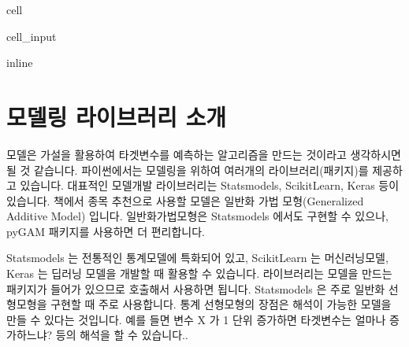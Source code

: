 \documentclass[letterpaper,10pt,english]{jupyterBook}
\begin{document}
\begin{sphinxuseclass}{cell}\begin{sphinxVerbatimInput}

\begin{sphinxuseclass}{cell_input}
\begin{sphinxVerbatim}[commandchars=\\\{\}]
   
 inline
   
   
   
 
  
\end{sphinxVerbatim}

\end{sphinxuseclass}\end{sphinxVerbatimInput}

\end{sphinxuseclass}

\part{모델링 라이브러리 소개}
\label{\detokenize{chapter5/5.2.2_Modeling_Library:id1}}\label{\detokenize{chapter5/5.2.2_Modeling_Library::doc}}
\sphinxAtStartPar
모델은 가설을 활용하여 타겟변수를 예측하는 알고리즘을 만드는 것이라고 생각하시면 될 것 같습니다. 파이썬에서는 모델링을 위하여 여러개의 라이브러리(패키지)를 제공하고 있습니다. 대표적인 모델개발 라이브러리는 Statsmodels, Scikit\sphinxhyphen{}Learn, Keras 등이 있습니다. 책에서 종목 추천으로 사용할 모델은 일반화 가법 모형(Generalized Additive Model) 입니다. 일반화가법모형은 Statsmodels 에서도 구현할 수 있으나, pyGAM 패키지를 사용하면 더 편리합니다.

\sphinxAtStartPar
Statsmodels 는 전통적인 통계모델에 특화되어 있고, Scikit\sphinxhyphen{}Learn 는 머신러닝모델, Keras 는 딥러닝 모델을 개발할 때 활용할 수 있습니다. 라이브러리는 모델을 만드는 패키지가 들어가 있으므로 호출해서 사용하면 됩니다. Statsmodels 은 주로 일반화 선형모형을 구현할 때 주로 사용합니다. 통계 선형모형의 장점은 해석이 가능한 모델을 만들 수 있다는 것입니다. 예를 들면 변수 X 가 1 단위 증가하면 타겟변수는 얼마나 증가하느냐? 등의 해석을 할 수 있습니다..
\end{document}
